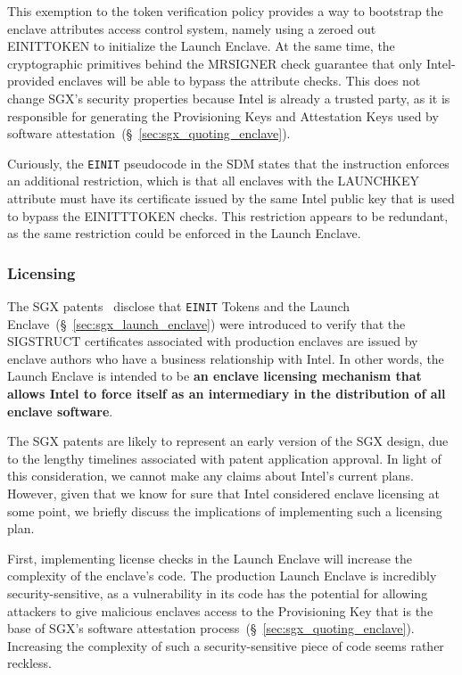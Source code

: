 This exemption to the token verification policy provides a way to bootstrap the
enclave attributes access control system, namely using a zeroed out EINITTOKEN
to initialize the Launch Enclave. At the same time, the cryptographic
primitives behind the MRSIGNER check guarantee that only Intel-provided
enclaves will be able to bypass the attribute checks. This does not change
SGX's security properties because Intel is already a trusted party, as it is
responsible for generating the Provisioning Keys and Attestation Keys used by
software attestation~(\S~\ref{sec:sgx_quoting_enclave}).

Curiously, the \texttt{EINIT} pseudocode in the SDM states that the instruction
enforces an additional restriction, which is that all enclaves with the
LAUNCHKEY attribute must have its certificate issued by the same Intel public
key that is used to bypass the EINITTTOKEN checks. This restriction appears to
be redundant, as the same restriction could be enforced in the Launch Enclave.


\subsubsection{Licensing}
\label{sec:sgx_licensing}

The SGX patents~\cite{intel2013patent1, intel2013patent2} disclose that
\texttt{EINIT} Tokens and the Launch Enclave~(\S~\ref{sec:sgx_launch_enclave})
were introduced to verify that the SIGSTRUCT certificates associated with
production enclaves are issued by enclave authors who have a business
relationship with Intel. In other words, the Launch Enclave is intended to be
\textbf{an enclave licensing mechanism that allows Intel to force itself as an
intermediary in the distribution of all enclave software}.

The SGX patents are likely to represent an early version of the SGX design, due
to the lengthy timelines associated with patent application approval.
In light of this consideration, we cannot make any claims about Intel's current
plans. However, given that we know for sure that Intel considered enclave
licensing at some point, we briefly discuss the implications of implementing
such a licensing plan.

First, implementing license checks in the Launch Enclave will increase the
complexity of the enclave's code. The production Launch Enclave is incredibly
security-sensitive, as a vulnerability in its code has the potential for
allowing attackers to give malicious enclaves access to the Provisioning Key
that is the base of SGX's software attestation
process~(\S~\ref{sec:sgx_quoting_enclave}). Increasing the complexity of such a
security-sensitive piece of code seems rather reckless.

